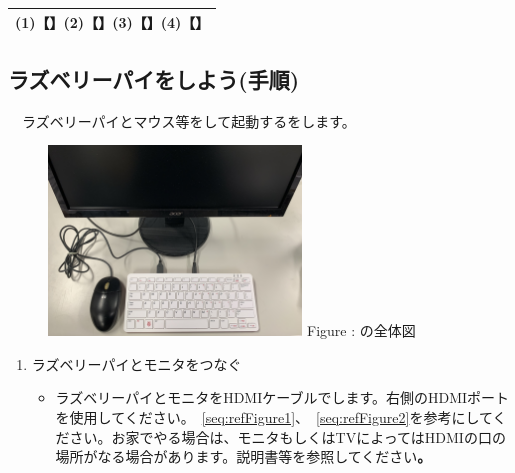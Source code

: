 \documentclass[a4paper,12pt]{jarticle}
\begin{document}
\begin{enumerate}
\begin{itemize}
\begin{table}[htbp]
                                \centering
                              \begin{tabular}{|c|}
                                \hline
                                    (1)【\hspace{3pc}】(2)【\hspace{3pc}】(3)【\hspace{3pc}】(4)【\hspace{3pc}】\\
                                    \hline
                                \end{tabular}
                                \end{table}
          \end{itemize}



          \clearpage
\subsection{ラズベリーパイをしよう(手順)}
\ \ ラズベリーパイとマウス等をして起動するをします。

\begin{figure}[ht]
  \centering
  \begin{minipage}{12.204cm}
    {\upshape
      \includegraphics[width=0.6\textwidth]{connections01-2023.jpg}
      \newline
      Figure : の全体図}

  \end{minipage}
\end{figure}

\begin{enumerate}
  \item ラズベリーパイとモニタをつなぐ

        \begin{itemize}
          \item
                ラズベリーパイとモニタをHDMIケーブルでします。右側のHDMIポートを使用してください。~\ref{seq:refFigure1}、~\ref{seq:refFigure2}を参考にしてください。お家でやる場合は、モニタもしくはTVによってはHDMIの口の場所がなる場合があります。説明書等を参照してください\textbf{。}



\end{itemize}
\end{enumerate}
\end{enumerate}
\end{document}
